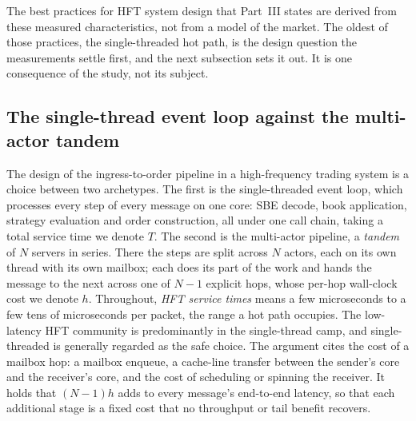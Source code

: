 \documentclass[11pt]{article}
\begin{document}
The best practices for HFT system design that Part~III states are derived from these
measured characteristics, not from a model of the market. The oldest of those practices,
the single-threaded hot path, is the design question the measurements settle first, and
the next subsection sets it out. It is one consequence of the study, not its subject.

\subsection{The single-thread event loop against the multi-actor tandem}
\label{sec:intro-debate}

The design of the ingress-to-order pipeline in a high-frequency trading system is a
choice between two archetypes. The first is the single-threaded event loop, which
processes every step of every message on one core: SBE decode, book application, strategy
evaluation and order construction, all under one call chain, taking a total service time
we denote $T$. The second is the multi-actor pipeline, a \emph{tandem} of $N$ servers in
series. There the steps are split across $N$ actors, each on its own thread with its own
mailbox; each does its part of the work and hands the message to the next across one of
$N-1$ explicit hops, whose per-hop wall-clock cost we denote $h$. Throughout, \emph{HFT service times} means a few microseconds to a few tens of
microseconds per packet, the range a hot path occupies. The low-latency HFT community is
predominantly in the single-thread camp, and single-threaded is generally
regarded as the safe choice. The argument cites the cost of a mailbox hop: a mailbox enqueue, a cache-line transfer
between the sender's core and the receiver's core, and the cost of scheduling or spinning
the receiver. It holds that $(N-1) h$ adds to every message's end-to-end latency, so that
each additional stage is a fixed cost that no throughput or tail benefit recovers.
\end{document}
